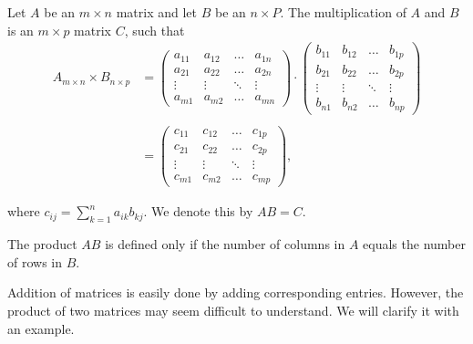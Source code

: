 \documentclass{subfile}
\begin{document}
	\begin{definition}\label{def:matrixproduct}
		Let $A$ be an $m\times n$ matrix and let $B$ be an $n\times P$. The multiplication of $A$ and $B$ is an $m \times p$ matrix $C$, such that
		\begin{align*}
		{A_{m \times n}} \times {B_{n \times p}} &= \begin{pmatrix}
			{{a_{11}}}&{{a_{12}}}& \ldots &{{a_{1n}}}\\
			{{a_{21}}}&{{a_{22}}}& \ldots &{{a_{2n}}}\\
			\vdots & \vdots & \ddots & \vdots \\
			{{a_{m1}}}&{{a_{m2}}}& \ldots &{{a_{mn}}}
				\end{pmatrix} \cdot \begin{pmatrix}
			{{b_{11}}}&{{b_{12}}}& \ldots &{{b_{1p}}}\\
			{{b_{21}}}&{{b_{22}}}& \ldots &{{b_{2p}}}\\
			\vdots & \vdots & \ddots & \vdots \\
			{{b_{n1}}}&{{b_{n2}}}& \ldots &{{b_{np}}}
			\end{pmatrix}\\
		\\
		&= \begin{pmatrix}
			{{c_{11}}}&{{c_{12}}}& \ldots &{{c_{1p}}}\\
			{{c_{21}}}&{{c_{22}}}& \ldots &{{c_{2p}}}\\
			\vdots & \vdots & \ddots & \vdots \\
			{{c_{m1}}}&{{c_{m2}}}& \ldots &{{c_{mp}}}
		\end{pmatrix},
		\end{align*}
		
		where $c_{ij}= \displaystyle\sum_{k=1}^{n} a_{ik}b_{kj}$. We denote this by $AB=C$.
	\end{definition}
	
	
	\begin{note}
		The product $AB$ is defined only if the number of columns in $A$ equals the number of rows in $B$.
	\end{note}
	
	
Addition of matrices is easily done by adding corresponding entries. However, the product of two matrices may seem difficult to understand. We will clarify it with an example.
\end{document}
